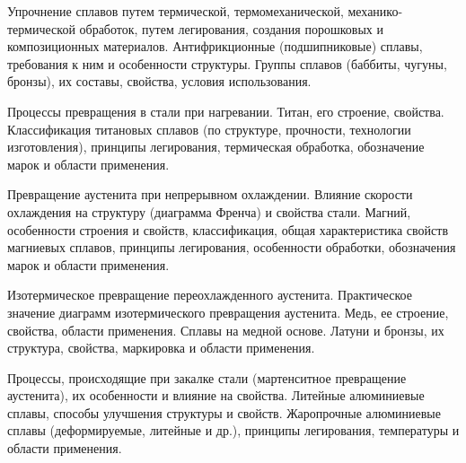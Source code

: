 \documentclass[
	14pt,
	a4paper,
	]
	{scrartcl}
\begin{document}
\vfill

\newpage


\shapk
{}
\setcounter{zad}{0}

\vfill
\z Упрочнение сплавов путем термической, термомеханической, механико-термической обработок, путем легирования, создания порошковых и композиционных материалов.
 \vfill
\z Антифрикционные (подшипниковые) сплавы, требования к ним и особенности структуры. Группы сплавов (баббиты, чугуны, бронзы), их составы, свойства, условия использования.
 \vfill

\vfill

\newpage


\shapk
{}
\setcounter{zad}{0}

\vfill
\z Процессы превращения в стали при нагревании.
 \vfill
\z Титан, его строение, свойства. Классификация титановых сплавов (по структуре, прочности, технологии изготовления), принципы легирования, термическая обработка, обозначение марок и области применения.
 \vfill

\vfill

\newpage


\shapk
{}
\setcounter{zad}{0}

\vfill
\z Превращение аустенита при непрерывном охлаждении. Влияние скорости охлаждения на структуру (диаграмма Френча) и свойства стали.
 \vfill
\z Магний, особенности строения и свойств, классификация, общая характеристика свойств магниевых сплавов, принципы легирования, особенности обработки, обозначения марок и области применения.
 \vfill

\vfill

\newpage


\shapk
{}
\setcounter{zad}{0}

\vfill
\z Изотермическое превращение переохлажденного аустенита. Практическое значение диаграмм изотермического превращения аустенита.
 \vfill
\z Медь, ее строение, свойства, области применения. Сплавы на медной основе. Латуни и бронзы, их структура, свойства, маркировка и области применения.
 \vfill

\vfill

\newpage


\shapk
{}
\setcounter{zad}{0}

\vfill
\z Процессы, происходящие при закалке стали (мартенситное превращение аустенита), их особенности и влияние на свойства.
 \vfill
\z Литейные алюминиевые сплавы, способы улучшения структуры и свойств. Жаропрочные алюминиевые сплавы (деформируемые, литейные и др.), принципы легирования, температуры и области применения.
 \vfill
\end{document}
